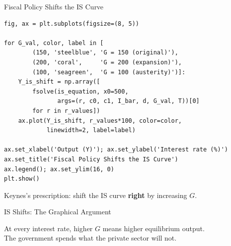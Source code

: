 \documentclass[aspectratio=169, 10pt]{beamer}
\begin{document}
\begin{frame}[fragile]{Fiscal Policy Shifts the IS Curve}
\begin{lstlisting}
fig, ax = plt.subplots(figsize=(8, 5))

for G_val, color, label in [
        (150, 'steelblue', 'G = 150 (original)'),
        (200, 'coral',     'G = 200 (expansion)'),
        (100, 'seagreen',  'G = 100 (austerity)')]:
    Y_is_shift = np.array([
        fsolve(is_equation, x0=500,
               args=(r, c0, c1, I_bar, d, G_val, T))[0]
        for r in r_values])
    ax.plot(Y_is_shift, r_values*100, color=color,
            linewidth=2, label=label)

ax.set_xlabel('Output (Y)'); ax.set_ylabel('Interest rate (%)')
ax.set_title('Fiscal Policy Shifts the IS Curve')
ax.legend(); ax.set_ylim(16, 0)
plt.show()
\end{lstlisting}
\vspace{0.3em}
Keynes's prescription: shift the IS curve \textbf{right} by increasing $G$.
\end{frame}

\begin{frame}{IS Shifts: The Graphical Argument}
\begin{center}
\end{center}
\vspace{0.3em}
At every interest rate, higher $G$ means higher equilibrium output.\\
The government spends what the private sector will not.
\end{frame}
\end{document}
